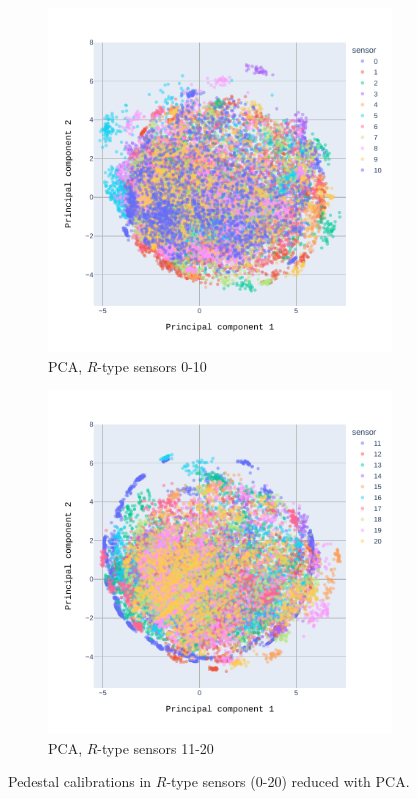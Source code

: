 \begin{figure}
\centering
  \begin{subfigure}[b]{0.7\textwidth}
    \centering
    \includegraphics[width=\linewidth]{figures/chapter4/dimred/PCA_pedestals_r_phi_0.pdf}
    \caption{PCA, $R$-type sensors 0-10}
    \label{plot:PCA_pedestals_0}
  \end{subfigure}
  \begin{subfigure}[b]{0.7\textwidth}
    \centering
    \includegraphics[width=\linewidth]{figures/chapter4/dimred/PCA_pedestals_r_phi_1.pdf}
    \caption{PCA, $R$-type sensors 11-20}
    \label{plot:PCA_pedestals_1}
  \end{subfigure}


\caption[All calibrationa]{Pedestal calibrations in $R$-type sensors (0-20) reduced with PCA.}
\label{plot:pca_all_peda}
\end{figure}

